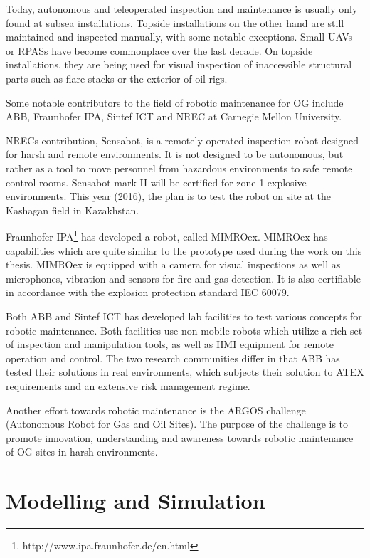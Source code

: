 Today, autonomous and teleoperated inspection and maintenance is usually only found at subsea installations. Topside installations on the other hand are still maintained and inspected manually, with some notable exceptions. Small \acp{UAV} or \acp{RPAS} have become commonplace over the last decade. On topside installations, they are being used for visual inspection of inaccessible structural parts such as flare stacks or the exterior of oil rigs.

Some notable contributors to the field of robotic maintenance for \ac{OG} include ABB, \ac{Fraunhofer IPA}, Sintef ICT\cite{sintef_robot_consept} and NREC  at  Carnegie
Mellon University. 

NRECs contribution, Sensabot, is a remotely operated inspection robot designed for harsh and remote environments\cite{deploymentsensabot}. It is not designed to be autonomous, but rather as a tool to move personnel from hazardous environments to safe remote control rooms. Sensabot mark II will be certified for zone 1 explosive environments. This year (2016), the plan is to test the robot on site at the Kashagan field in Kazakhstan\cite{peerless2016robot}.

\ac{Fraunhofer IPA}\footnote{http://www.ipa.fraunhofer.de/en.html} has developed a robot, called \ac{MIMROex}. \ac{MIMROex} has capabilities which are quite similar to the prototype used during the work on this thesis. \ac{MIMROex} is equipped with a camera for visual inspections as well as microphones, vibration and sensors for fire and gas detection. It is also certifiable in accordance with the explosion protection standard IEC 60079\cite{MIMROex}. 

Both ABB and Sintef ICT has developed lab facilities to test various concepts for robotic maintenance. Both facilities use non-mobile robots which utilize a rich set of inspection and manipulation tools, as well as \ac{HMI} equipment for remote operation and control. The two research communities differ in that ABB has tested their solutions in real environments, which subjects their solution to ATEX requirements and an extensive risk management regime\cite{StepwiseApproachToRobotics}. 

Another effort towards robotic maintenance is the ARGOS challenge (Autonomous Robot for Gas and Oil Sites). The purpose of the challenge is to promote innovation, understanding and awareness towards robotic maintenance of \ac{OG} sites in harsh environments\cite{ARGOS}.

\section{Modelling and Simulation}

